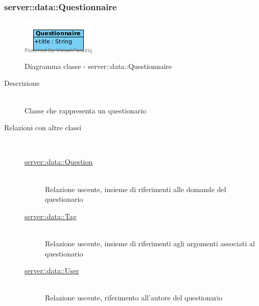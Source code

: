 \vspace{0.5cm}
\hypertarget{server::data::Questionnaire}{}
\subsubsection[Questionnaire]{server::data::Questionnaire}
\begin{center}
			\begin{figure}[H]
				\centering \includegraphics[scale=4, max width=\textwidth, max height=\myheight]{../img/diagrammiClassi/server/data/Questionnaire.png}
				\caption{Diagramma classe - server::data::Questionnaire}
			\end{figure}
		\end{center}\begin{description}
\item[Descrizione] \hfill \\
 Classe che rappresenta un questionario
\item[Relazioni con altre classi] \hfill \\
 \vspace{-7mm}
\begin{description}
\item[\hyperlink{server::data::Question}{server::data::Question}] \hfill \\
 Relazione uscente, insieme di riferimenti alle domande del questionario
\item[\hyperlink{server::data::Tag}{server::data::Tag}] \hfill \\
 Relazione uscente, insieme di riferimenti agli argomenti associati al questionario
\item[\hyperlink{server::data::User}{server::data::User}] \hfill \\
 Relazione uscente, riferimento all'autore del questionario
\end{description}


\end{description}
